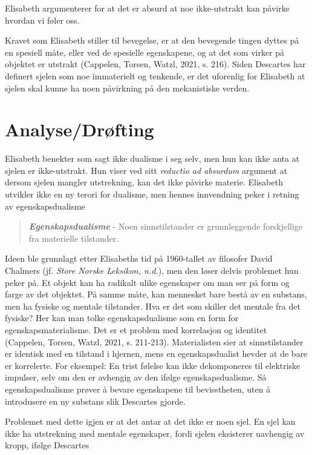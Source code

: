 \documentclass[12pt, a4paper]{article}
\begin{document}
Elisabeth argumenterer for at det er absurd at noe ikke-utstrakt kan påvirke hvordan vi føler oss. 

Kravet som Elisabeth stiller til bevegelse, er at den bevegende tingen dyttes på en spesiell måte, eller ved de spesielle egenskapene, og at det som virker på objektet er utstrakt (Cappelen, Torsen, Watzl, 2021, s. 216). Siden Descartes har definert sjelen som noe immaterielt og tenkende, er det uforenlig for Elisabeth at sjelen skal kunne ha noen påvirkning på den mekanistiske verden. 

\section{Analyse/Drøfting}

Elisabeth benekter som sagt ikke dualisme i seg selv, men hun kan ikke anta at sjelen er ikke-utstrakt. Hun viser ved sitt \textit{reductio ad absurdum} argument at dersom sjelen mangler utstrekning, kan det ikke påvirke materie. Elisabeth utvikler ikke en ny terori for dualisme, men hennes innvendning peker i retning av egenskapsdualisme

\begin{quote}
    \textbf{\textit{Egenskapsdualisme}} - Noen sinnstilstander er grunnleggende forskjellige fra materielle tilstander.
\end{quote}

Ideen ble grunnlagt etter Elisabeths tid på 1960-tallet av filosofer David Chalmers (jf. \textit{Store Norske Leksikon, n.d.}), men den løser delvis problemet hun peker på. Et objekt kan ha radikalt ulike egenskaper om man ser på form og farge av det objektet. På samme måte, kan mennesket bare bestå av en substans, men ha fysiske og mentale tilstander. Hva er det som skiller det mentale fra det fysiske? Her kan man tolke egenskapsdualisme som en form for egenskapsmaterialisme. Det er et problem med korrelasjon og identitet (Cappelen, Torsen, Watzl, 2021, s. 211-213). Materialisten sier at sinnstilstander er identisk med en tilstand i hjernen, mens en egenskapsdualist hevder at de bare er korrelerte. For eksempel: En trist følelse kan ikke dekomponeres til elektriske impulser, selv om den er avhengig av den ifølge egenskapsdualisme. Så egenskapsdualisme prøver å bevare egenskapene til bevisstheten, uten å introdusere en ny substans slik Descartes gjorde.

Problemet med dette igjen er at det antar at det ikke er noen sjel. En sjel kan ikke ha utstrekning med mentale egenskaper, fordi sjelen eksisterer uavhengig av kropp, ifølge Descartes
\end{document}
